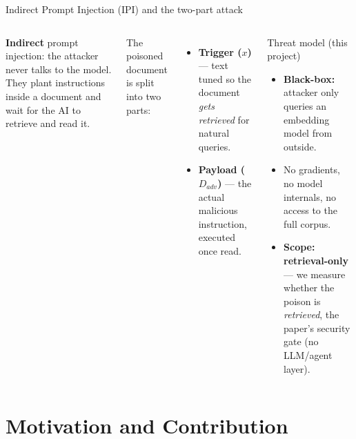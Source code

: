 \documentclass[aspectratio=169,11pt]{beamer}
\begin{document}
\begin{frame}{Indirect Prompt Injection (IPI) and the two-part attack}
  \small
  \begin{columns}[T]
    \textbf{Indirect} prompt injection: the attacker never talks to the model. They plant instructions inside a document and wait for the AI to retrieve and read it.
    \vspace{0.6em}

    The poisoned document is split into two parts:
    \begin{itemize}
      \item \textbf{Trigger ($x$)} --- text tuned so the document \emph{gets retrieved} for natural queries.
      \item \textbf{Payload ($D_{adv}$)} --- the actual malicious instruction, executed once read.
    \end{itemize}
    \begin{block}{Threat model (this project)}
      \scriptsize
      \begin{itemize}
        \item \textbf{Black-box:} attacker only queries an embedding model from outside.
        \item No gradients, no model internals, no access to the full corpus.
        \item \textbf{Scope: retrieval-only} --- we measure whether the poison is \emph{retrieved}, the paper's security gate (no LLM/agent layer).
      \end{itemize}
    \end{block}
  \end{columns}
\end{frame}

\section{Motivation and Contribution}
\end{document}
